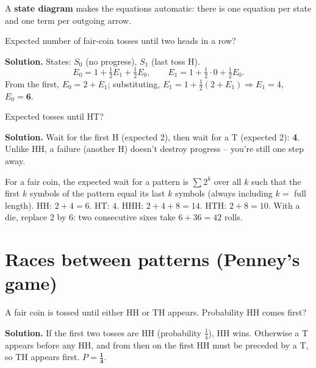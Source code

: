 \documentclass[11pt,a4paper,openany]{report}
\begin{document}
\begin{center}
\end{center}
A \textbf{state diagram} makes the equations automatic: there is one equation per state and one term per outgoing arrow.
\begin{example}
Expected number of fair-coin tosses until two heads in a row?

\textbf{Solution.} States: $S_0$ (no progress), $S_1$ (last toss H).
\[E_0=1+\tfrac12E_1+\tfrac12E_0,\qquad E_1=1+\tfrac12\cdot0+\tfrac12E_0.\]
From the first, $E_0=2+E_1$; substituting, $E_1=1+\frac12(2+E_1)\Rightarrow E_1=4$, $E_0=\mathbf6$.
\end{example}

\begin{example}
Expected tosses until HT?

\textbf{Solution.} Wait for the first H (expected 2), then wait for a T (expected 2): \textbf{4}. Unlike HH, a failure (another H) doesn't destroy progress -- you're still one step away.
\end{example}

\begin{shortcut}
For a fair coin, the expected wait for a pattern is $\sum 2^k$ over all $k$ such that the first $k$ symbols of the pattern equal its last $k$ symbols (always including $k=$ full length). HH: $2+4=6$. HT: $4$. HHH: $2+4+8=14$. HTH: $2+8=10$. With a die, replace 2 by 6: two consecutive sixes take $6+36=42$ rolls.
\end{shortcut}

\section{Races between patterns (Penney's game)}
\begin{example}
A fair coin is tossed until either HH or TH appears. Probability HH comes first?

\textbf{Solution.} If the first two tosses are HH (probability $\frac14$), HH wins. Otherwise a T appears before any HH, and from then on the first HH must be preceded by a T, so TH appears first. $P=\mathbf{\frac14}$.
\end{example}
\end{document}
